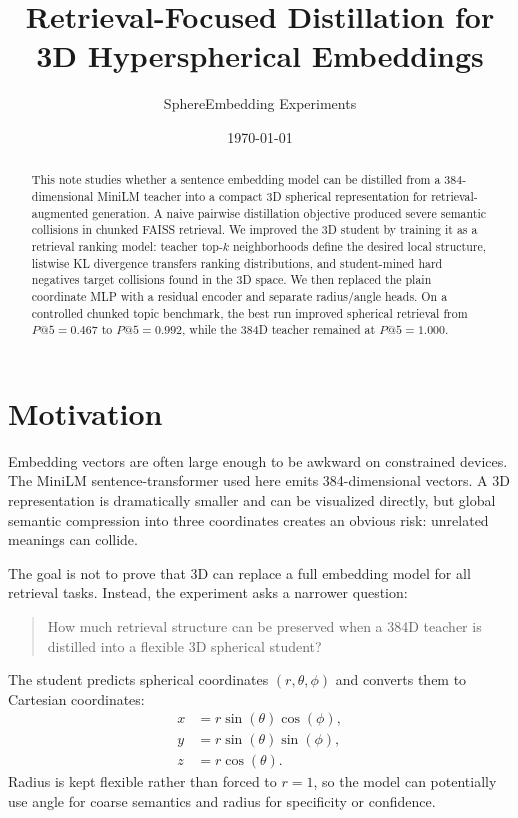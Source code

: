 \documentclass[11pt]{article}
\title{Retrieval-Focused Distillation for 3D Hyperspherical Embeddings}
\author{SphereEmbedding Experiments}
\date{\today}
\begin{document}
\maketitle

\begin{abstract}
This note studies whether a sentence embedding model can be distilled from a 384-dimensional MiniLM teacher into a compact 3D spherical representation for retrieval-augmented generation. A naive pairwise distillation objective produced severe semantic collisions in chunked FAISS retrieval. We improved the 3D student by training it as a retrieval ranking model: teacher top-$k$ neighborhoods define the desired local structure, listwise KL divergence transfers ranking distributions, and student-mined hard negatives target collisions found in the 3D space. We then replaced the plain coordinate MLP with a residual encoder and separate radius/angle heads. On a controlled chunked topic benchmark, the best run improved spherical retrieval from $P@5=0.467$ to $P@5=0.992$, while the 384D teacher remained at $P@5=1.000$.
\end{abstract}

\section{Motivation}
Embedding vectors are often large enough to be awkward on constrained devices. The MiniLM sentence-transformer used here emits 384-dimensional vectors. A 3D representation is dramatically smaller and can be visualized directly, but global semantic compression into three coordinates creates an obvious risk: unrelated meanings can collide.

The goal is not to prove that 3D can replace a full embedding model for all retrieval tasks. Instead, the experiment asks a narrower question:

\begin{quote}
How much retrieval structure can be preserved when a 384D teacher is distilled into a flexible 3D spherical student?
\end{quote}

The student predicts spherical coordinates $(r,\theta,\phi)$ and converts them to Cartesian coordinates:
\begin{align}
x &= r\sin(\theta)\cos(\phi),\\
y &= r\sin(\theta)\sin(\phi),\\
z &= r\cos(\theta).
\end{align}
Radius is kept flexible rather than forced to $r=1$, so the model can potentially use angle for coarse semantics and radius for specificity or confidence.
\end{document}
